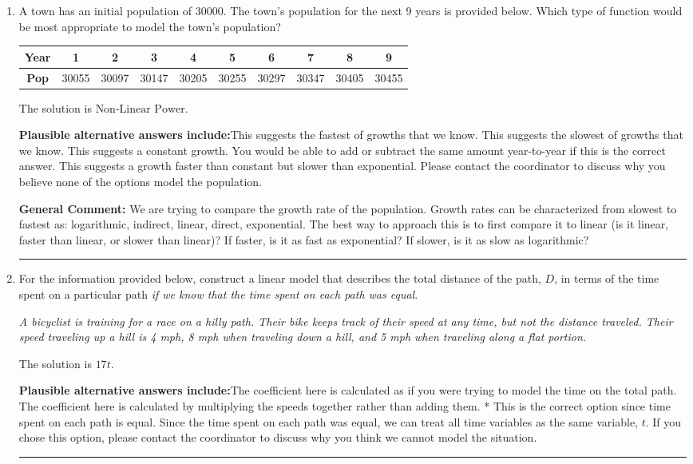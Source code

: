 \documentclass{extbook}[14pt]
\newcommand{\litem}[1]{\item #1

\rule{\textwidth}{0.4pt}}
\begin{document}
\begin{enumerate}\litem{
A town has an initial population of 30000. The town's population for the next 9 years is provided below. Which type of function would be most appropriate to model the town's population?


\begin{tabular}{c|c|c|c|c|c|c|c|c|c}
\textbf{Year} &1 &2 &3 &4 &5 &6 &7 &8 &9\tabularnewline \hline
\textbf{Pop} &30055 &30097 &30147 &30205 &30255 &30297 &30347 &30405 &30455\end{tabular}The solution is \( \text{Non-Linear Power} \).\begin{enumerate}[label=\Alph*.]
\textbf{Plausible alternative answers include:}This suggests the fastest of growths that we know.
This suggests the slowest of growths that we know.
This suggests a constant growth. You would be able to add or subtract the same amount year-to-year if this is the correct answer.
This suggests a growth faster than constant but slower than exponential.
Please contact the coordinator to discuss why you believe none of the options model the population.
\end{enumerate}

\textbf{General Comment:} We are trying to compare the growth rate of the population. Growth rates can be characterized from slowest to fastest as: logarithmic, indirect, linear, direct, exponential. The best way to approach this is to first compare it to linear (is it linear, faster than linear, or slower than linear)? If faster, is it as fast as exponential? If slower, is it as slow as logarithmic?
}
\litem{
For the information provided below, construct a linear model that describes the total distance of the path, $D$, in terms of the time spent on a particular path \textit{if we know that the time spent on each path was equal}.

\begin{center}
    \textit{ A bicyclist is training for a race on a hilly path. Their bike keeps track of their speed at any time, but not the distance traveled. Their speed traveling up a hill is 4 mph, 8 mph when traveling down a hill, and 5 mph when traveling along a flat portion. }
\end{center}
The solution is \( 17 t \).\begin{enumerate}[label=\Alph*.]
\textbf{Plausible alternative answers include:}The coefficient here is calculated as if you were trying to model the time on the total path.
The coefficient here is calculated by multiplying the speeds together rather than adding them.
* This is the correct option since time spent on each path is equal.
Since the time spent on each path was equal, we can treat all time variables as the same variable, $t$.
If you chose this option, please contact the coordinator to discuss why you think we cannot model the situation.
\end{enumerate}

}
\end{enumerate}
\end{document}
